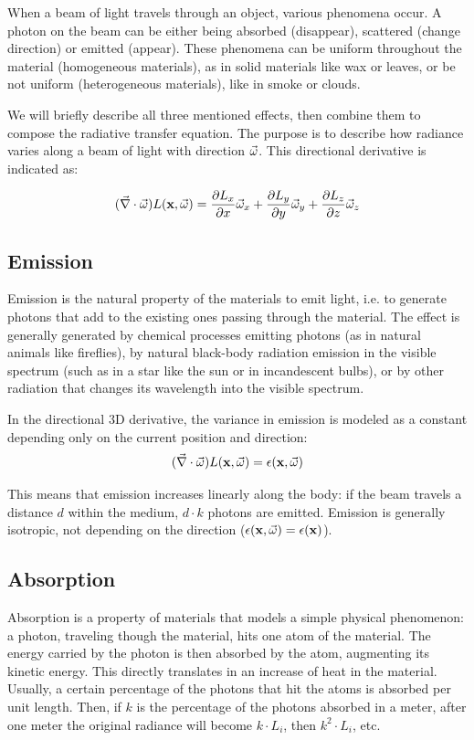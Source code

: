 When a beam of light travels through an object, various phenomena occur. A photon on the beam can be either being absorbed (disappear), scattered (change direction) or emitted (appear). These phenomena can be uniform throughout the material (homogeneous materials), as in solid materials like wax or leaves, or be not uniform (heterogeneous materials), like in smoke or clouds.

We will briefly describe all three mentioned effects, then combine them to compose the radiative transfer equation. The purpose is to describe how radiance varies along a beam of light with direction $\vec{\omega}$. This directional derivative is indicated as:

$$
(\vec{\nabla} \cdot \vec{\omega}) L(\mathbf{x}, \vec{\omega}) = \frac{\partial L_x}{\partial x} \vec{\omega}_x + \frac{\partial L_y}{\partial y} \vec{\omega}_y +\frac{\partial L_z}{\partial z} \vec{\omega}_z
$$ 

\subsection{Emission}
Emission is the natural property of the materials to emit light, i.e. to generate photons that add to the existing ones passing through the material. The effect is generally generated by chemical processes emitting photons (as in natural animals like fireflies), by natural black-body radiation emission in the visible spectrum (such as in a star like the sun or in incandescent bulbs), or by other radiation that changes its wavelength into the visible spectrum.

In the directional 3D derivative, the variance in emission is modeled as a constant depending only on the current position and direction:
$$
(\vec{\nabla} \cdot \vec{\omega}) L(\mathbf{x}, \vec{\omega}) = \epsilon(\mathbf{x}, \vec{\omega})
$$

This means that emission increases linearly along the body: if the beam travels a distance $d$ within the medium, $d \cdot k$ photons are emitted. Emission is generally isotropic, not depending on the direction ($ \epsilon(\mathbf{x}, \vec{\omega}) =  \epsilon(\mathbf{x})$).

\subsection{Absorption}
Absorption is a property of materials that models a simple physical phenomenon: a photon, traveling though the material, hits one atom of the material. The energy carried by the photon is then absorbed by the atom, augmenting its kinetic energy. This directly translates in an increase of heat in the material. Usually, a certain percentage of the photons that hit the atoms is absorbed per unit length. Then, if $k$ is the percentage of the photons absorbed in a meter, after one meter the original radiance will become $k \cdot L_i$, then $k^2 \cdot L_i$, etc.


